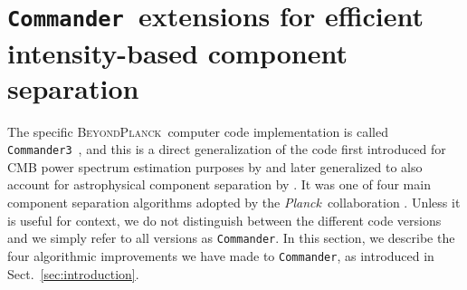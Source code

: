 \documentclass{aa}
\def\Planck{\textit{Planck}}
\def\commander{\texttt{Commander}}
\def\commanderthree{\texttt{Commander3}}
\newcommand{\BP}{\textsc{BeyondPlanck}}
\begin{document}
\section{\commander\ extensions for efficient intensity-based component separation}
\label{sec:algorithms}

The specific \BP\ computer code implementation is called
\commanderthree\ \citep{bp03}, and this is a direct generalization of the
code first introduced for CMB power spectrum estimation purposes by
\citet{eriksen:2004} and later generalized to also account for
astrophysical component separation by
\citet{eriksen2008,seljebotn:2013,seljebotn:2019}. It was one of four
main component separation algorithms adopted by the
\Planck\ collaboration \citep{planck2013-p06, planck2014-a12,
  planck2016-l04, npipe}. Unless it is useful for context, we do not
distinguish between the different code versions and we simply refer to all versions as \commander.
In this section, we describe the four algorithmic improvements we have made to \commander,
as introduced in Sect.~\ref{sec:introduction}.
\end{document}
